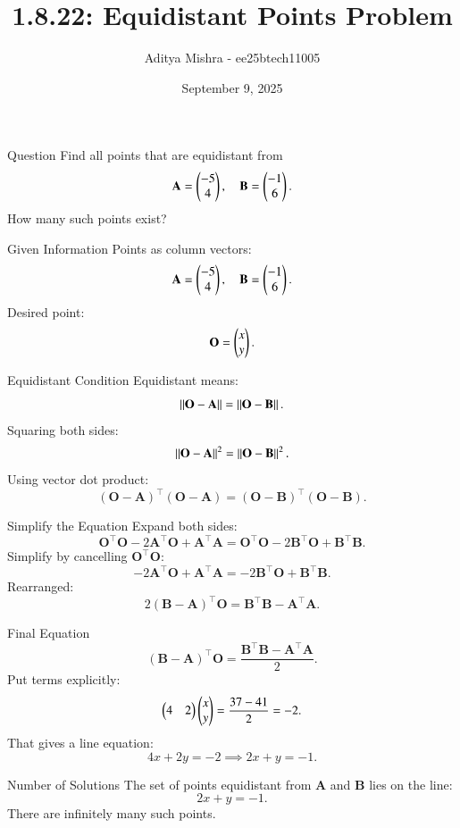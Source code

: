 \documentclass{beamer}
\title{1.8.22: Equidistant Points Problem}
\author{Aditya Mishra - ee25btech11005}
\date{September 9, 2025}
\renewcommand{\vec}[1]{\mathbf{#1}}
\begin{document}
\frame{\titlepage}
\begin{frame}{Question}
Find all points that are equidistant from
\[
\vec{A} = \myvec{-5 \\ 4}, \quad
\vec{B} = \myvec{-1 \\ 6}.
\]
How many such points exist?
\end{frame}

\begin{frame}{Given Information}
Points as column vectors:
\[
\vec{A} = \myvec{-5 \\ 4}, \quad
\vec{B} = \myvec{-1 \\ 6}.
\]
Desired point:
\[
\vec{O} = \myvec{x \\ y}.
\]
\end{frame}

\begin{frame}{Equidistant Condition}
Equidistant means:
\[
\norm{\vec{O} - \vec{A}} = \norm{\vec{O} - \vec{B}}.
\]
Squaring both sides:
\[
\norm{\vec{O} - \vec{A}}^2 = \norm{\vec{O} - \vec{B}}^2.
\]
Using vector dot product:
\[
(\vec{O} - \vec{A})^\top (\vec{O} - \vec{A}) = (\vec{O} - \vec{B})^\top (\vec{O} - \vec{B}).
\]
\end{frame}

\begin{frame}{Simplify the Equation}
Expand both sides:
\[
\vec{O}^\top \vec{O} - 2 \vec{A}^\top \vec{O} + \vec{A}^\top \vec{A} = \vec{O}^\top \vec{O} - 2 \vec{B}^\top \vec{O} + \vec{B}^\top \vec{B}.
\]
Simplify by cancelling \(\vec{O}^\top \vec{O}\):
\[
- 2 \vec{A}^\top \vec{O} + \vec{A}^\top \vec{A} = - 2 \vec{B}^\top \vec{O} + \vec{B}^\top \vec{B}.
\]
Rearranged:
\[
2 (\vec{B} - \vec{A})^\top \vec{O} = \vec{B}^\top \vec{B} - \vec{A}^\top \vec{A}.
\]
\end{frame}

\begin{frame}{Final Equation}
\[
(\vec{B} - \vec{A})^\top \vec{O} = \frac{\vec{B}^\top \vec{B} - \vec{A}^\top \vec{A}}{2}.
\]
Put terms explicitly:
\[
\begin{pmatrix}4 & 2\end{pmatrix} \begin{pmatrix}x \\ y\end{pmatrix} =
\frac{37 - 41}{2} = -2.
\]
That gives a line equation:
\[
4x + 2y = -2 \implies 2x + y = -1.
\]
\end{frame}

\begin{frame}{Number of Solutions}
The set of points equidistant from \(\vec{A}\) and \(\vec{B}\) lies on the line:
\[
2x + y = -1.
\]
There are infinitely many such points.
\end{frame}
\end{document}

